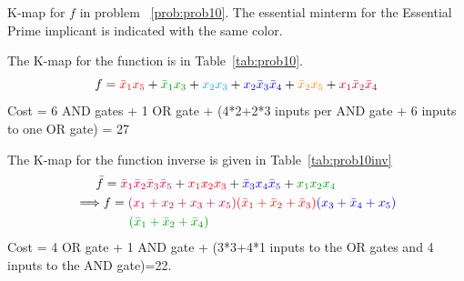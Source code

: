 \begin{table}[h]
  
  \caption{K-map for $f$ in problem ~\ref{prob:prob10}. The essential minterm for the Essential
  Prime implicant is indicated with the same color.}
\label{tab:prob10}
\end{table}

The K-map for the function is in Table~\ref{tab:prob10}.
\[
  f = {\cred \bx_1 x_5 } + {\cg \bx_1 x_3 } + {\color{cyan} x_2 x_3 }
  + {\cb x_2 \bx_3 \bx_4} + {\color{orange} \bx_2 x_5} 
  + {\color{purple} x_1 \bx_2 \bx_4}
\]
 Cost = 6 AND gates + 1 OR gate + (4*2+2*3 inputs per AND gate + 6 inputs to one OR gate) = 27

 The K-map for the function inverse is given in Table~\ref{tab:prob10inv}
 \begin{align*}
   \bar{f} &= {\color{purple} \bx_1 \bx_2 \bx_3 \bx_5} + {\cred x_1 x_2 x_3} + {\cb \bx_3 x_4 \bx_5 } + {\cg x_1 x_2 x_4}
   \\
   \implies  &f = {\color{purple} (x_1 + x_2 + x_3 + x_5)}{\cred (\bx_1 + \bx_2 + \bx_3)}{\cb (x_3 + \bx_4 + x_5)}
               \\&\qquad{\cg (\bx_1 + \bx_2 + \bx_4)}
 \end{align*}
 Cost = 4 OR gate + 1 AND gate + (3*3+4*1 inputs to the OR gates and 4 inputs to the AND gate)=22.
 


